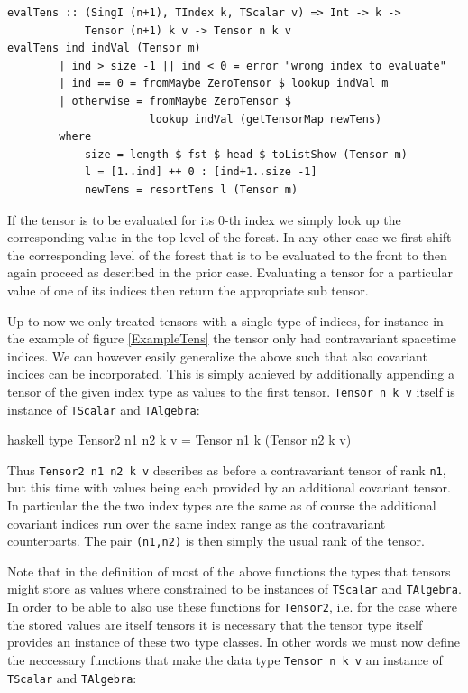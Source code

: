 \documentclass[a4paper,12pt, DIV=14, BCOR=5mm, twoside, headsepline]{scrbook}
\begin{document}
\begin{samepage} 
\begin{verbatim}
evalTens :: (SingI (n+1), TIndex k, TScalar v) => Int -> k ->
            Tensor (n+1) k v -> Tensor n k v 
evalTens ind indVal (Tensor m)
        | ind > size -1 || ind < 0 = error "wrong index to evaluate" 
        | ind == 0 = fromMaybe ZeroTensor $ lookup indVal m
        | otherwise = fromMaybe ZeroTensor $
                      lookup indVal (getTensorMap newTens)
        where 
            size = length $ fst $ head $ toListShow (Tensor m)
            l = [1..ind] ++ 0 : [ind+1..size -1]
            newTens = resortTens l (Tensor m)
\end{verbatim} 
\end{samepage}

If the tensor is to be evaluated for its 0-th index we simply look up the corresponding value in the top level of the forest. In any other case we first shift the corresponding level of the forest that is to be evaluated to the front to then again proceed as described in the prior case. Evaluating a tensor for a particular value of one of its indices then return the appropriate sub tensor. 

Up to now we only treated tensors with a single type of indices, for instance in the example of figure \ref{ExampleTens} the tensor only had contravariant spacetime indices. We can however easily generalize the above such that also covariant indices can be incorporated. This is simply achieved by additionally appending a tensor of the given index type as values
to the first tensor.
\texttt{Tensor n k v} itself is instance of \texttt{TScalar} and \texttt{TAlgebra}:
\begin{center}
\begin{cminted}{haskell}
type Tensor2 n1 n2 k v = Tensor n1 k (Tensor n2 k v)
\end{cminted}
\end{center}
Thus \texttt{Tensor2 n1 n2 k v} describes as before a contravariant tensor of rank \texttt{n1}, but this time with values being each provided by an additional covariant tensor. In particular the the two index types are the same as of course the additional covariant indices run over the same index range as the contravariant counterparts. The pair \texttt{(n1,n2)} is then simply the usual rank of the tensor.

Note that in the definition of most of the above functions the types that tensors might store as values where constrained to be instances of \texttt{TScalar} and \texttt{TAlgebra}. 
In order to be able to also use these functions for  \texttt{Tensor2}, i.e. for the case where the stored values are itself tensors it is necessary that the tensor type itself provides an instance of these two type classes. In other words we must now define the neccessary functions that make the data type
\texttt{Tensor n k v} an instance of \texttt{TScalar} and \texttt{TAlgebra}:
\end{document}
